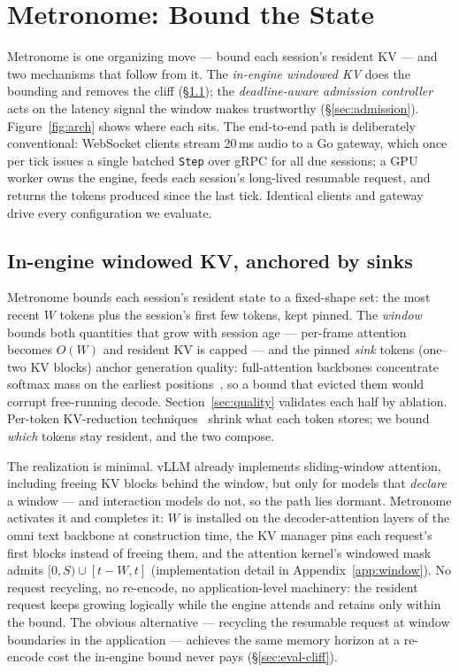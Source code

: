 \section{Metronome: Bound the State}
\label{sec:metronome}

Metronome is one organizing move --- bound each session's resident KV --- and two mechanisms that follow
from it. The \emph{in-engine windowed KV} does the bounding and removes the cliff
(\S\ref{sec:windowed}); the \emph{deadline-aware admission controller} acts on the latency signal the
window makes trustworthy (\S\ref{sec:admission}). Figure~\ref{fig:arch} shows where each sits. The
end-to-end path is deliberately conventional: WebSocket clients stream 20\,ms audio to a Go gateway,
which once per tick issues a single batched \texttt{Step} over gRPC for all due sessions; a GPU worker
owns the engine, feeds each session's long-lived resumable request, and returns the tokens produced
since the last tick. Identical clients and gateway drive every configuration we evaluate.

\subsection{In-engine windowed KV, anchored by sinks}
\label{sec:windowed}

Metronome bounds each session's resident state to a fixed-shape set: the most recent $W$ tokens plus
the session's first few tokens, kept pinned. The \emph{window} bounds both quantities that grow with
session age --- per-frame attention becomes $O(W)$ and resident KV is capped --- and the pinned
\emph{sink} tokens (one--two KV blocks) anchor generation quality: full-attention backbones
concentrate softmax mass on the earliest positions~\citep{streamingllm}, so a bound that evicted them
would corrupt free-running decode. Section~\ref{sec:quality} validates each half by ablation. Per-token
KV-reduction techniques~\citep{mqa,gqa,h2o,scissorhands,snapkv,kivi} shrink what each token stores; we
bound \emph{which} tokens stay resident, and the two compose.

The realization is minimal. vLLM already implements sliding-window attention, including freeing KV
blocks behind the window, but only for models that \emph{declare} a window --- and interaction models do
not, so the path lies dormant. Metronome activates it and completes it: $W$ is installed on the
decoder-attention layers of the omni text backbone at construction time, the KV manager pins each
request's first blocks instead of freeing them, and the attention kernel's windowed mask admits
$[0, S) \cup [t{-}W, t]$ (implementation detail in Appendix~\ref{app:window}). No request
recycling, no re-encode, no application-level machinery: the resident request keeps growing logically
while the engine attends and retains only within the bound. The obvious alternative --- recycling the
resumable request at window boundaries in the application --- achieves the same memory horizon at a
re-encode cost the in-engine bound never pays (\S\ref{sec:eval-cliff}).

